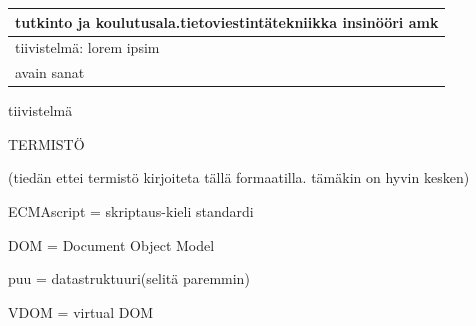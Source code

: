 \documentclass[11pt,a4paper,titlepage,oneside]{article}
\begin{document}
\begin{tabular}{ | l | }
    \begin{minipage}[t][1.5cm][t]{10cm}
    tutkinto ja koulutusala.\newline  tietoviestintätekniikka insinööri amk  

    \end{minipage}\\ \hline

    \begin{minipage}[t][7cm][t]{5cm}
    tiivistelmä: \newline lorem ipsim
    \end{minipage}\\ \hline

    \begin{minipage}[t][2cm][t]{5cm}
    avain sanat
    \end{minipage}\\ \hline

\end{tabular}

\newpage




tiivistelmä








\newpage




\setcounter{page}{0}
\pagestyle{empty}

\tableofcontents





\newpage





TERMISTÖ
\bigskip

(tiedän ettei termistö kirjoiteta tällä formaatilla. tämäkin on hyvin kesken)
\bigskip
 
ECMAscript = skriptaus-kieli standardi 
\bigskip

DOM = Document Object Model 
\bigskip

puu = datastruktuuri(selitä paremmin)
\bigskip

VDOM = virtual DOM
\bigskip
\end{document}
